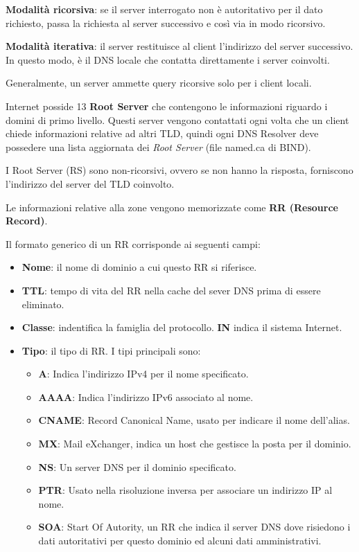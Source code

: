         \textbf{Modalità ricorsiva}: se il server interrogato non è autoritativo per il dato richiesto, passa la richiesta al server successivo e così via in modo ricorsivo.

        \textbf{Modalità iterativa}: il server restituisce al client l'indirizzo del server successivo. In questo modo, è il DNS locale che contatta direttamente i server coinvolti.

        Generalmente, un server ammette query ricorsive solo per i client locali.

        Internet posside 13 \textbf{Root Server} che contengono le informazioni riguardo i domini di primo livello. Questi server vengono contattati ogni volta che un client chiede informazioni relative ad altri TLD, quindi ogni DNS Resolver deve possedere una lista aggiornata dei \textit{Root Server} (file named.ca di BIND).

        I Root Server (RS) sono non-ricorsivi, ovvero se non hanno la risposta, forniscono l'indirizzo del server del TLD coinvolto.

        Le informazioni relative alla zone vengono memorizzate come \textbf{RR (Resource Record)}.

        Il formato generico di un RR corrisponde ai seguenti campi:
        \begin{itemize}
            \item \textbf{Nome}: il nome di dominio a cui questo RR si riferisce.
            \item \textbf{TTL}: tempo di vita del RR nella cache del sever DNS prima di essere eliminato.
            \item \textbf{Classe}: indentifica la famiglia del protocollo. \textbf{IN} indica il sistema Internet.
            \item \textbf{Tipo}: il tipo di RR. I tipi principali sono:
            \begin{itemize}
                \item \textbf{A}: Indica l'indirizzo IPv4 per il nome specificato.
                \item \textbf{AAAA}: Indica l'indirizzo IPv6 associato al nome.
                \item \textbf{CNAME}: Record Canonical Name, usato per indicare il nome dell'alias.
                \item \textbf{MX}: Mail eXchanger, indica un host che gestisce la posta per il dominio.
                \item \textbf{NS}: Un server DNS per il dominio specificato.
                \item \textbf{PTR}: Usato nella risoluzione inversa per associare un indirizzo IP al
                nome.
                \item \textbf{SOA}: Start Of Autority, un RR che indica il server DNS dove risiedono i dati autoritativi per questo dominio ed alcuni dati amministrativi.
            \end{itemize}
        \end{itemize}

